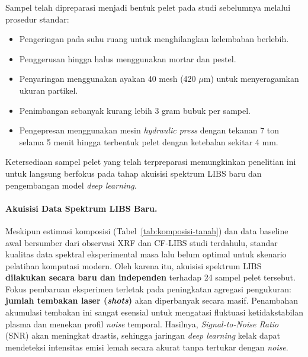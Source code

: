 \documentclass[12pt, a4paper]{article}
\begin{document}
Sampel telah dipreparasi menjadi bentuk pelet pada studi sebelumnya melalui prosedur standar:
\begin{itemize}[leftmargin=2cm]
    \item Pengeringan pada suhu ruang untuk menghilangkan kelembaban berlebih.
    \item Penggerusan hingga halus menggunakan mortar dan pestel.
    \item Penyaringan menggunakan ayakan 40 mesh (420 $\mu$m) untuk menyeragamkan ukuran partikel.
    \item Penimbangan sebanyak kurang lebih 3 gram bubuk per sampel.
    \item Pengepresan menggunakan mesin \textit{hydraulic press} dengan tekanan 7 ton selama 5 menit hingga terbentuk pelet dengan ketebalan sekitar 4 mm.
\end{itemize}

Ketersediaan sampel pelet yang telah terpreparasi memungkinkan penelitian ini untuk langsung berfokus pada tahap akuisisi spektrum LIBS baru dan pengembangan model \textit{deep learning}.


\paragraph{Akuisisi Data Spektrum LIBS Baru.}
Meskipun estimasi komposisi (Tabel~\ref{tab:komposisi-tanah}) dan data baseline awal bersumber dari observasi XRF dan CF-LIBS studi terdahulu, standar kualitas data spektral eksperimental masa lalu belum optimal untuk skenario pelatihan komputasi modern. Oleh karena itu, akuisisi spektrum LIBS \textbf{dilakukan secara baru dan independen} terhadap 24 sampel pelet tersebut. Fokus pembaruan eksperimen terletak pada peningkatan agregasi pengukuran: \textbf{jumlah tembakan laser (\textit{shots})} akan diperbanyak secara masif. Penambahan akumulasi tembakan ini sangat esensial untuk mengatasi fluktuasi ketidakstabilan plasma dan menekan profil \textit{noise} temporal. Hasilnya, \textit{Signal-to-Noise Ratio} (SNR) akan meningkat drastis, sehingga jaringan \textit{deep learning} kelak dapat mendeteksi intensitas emisi lemah secara akurat tanpa tertukar dengan \textit{noise}.
\end{document}
